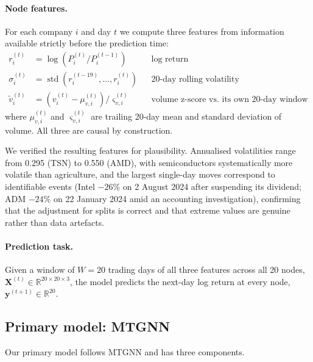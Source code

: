 \paragraph{Node features.} For each company $i$ and day $t$ we compute three features from information available strictly before the prediction time:
\begin{align}
r_i^{(t)} &= \log\!\left(P_i^{(t)} / P_i^{(t-1)}\right) && \text{log return}\\
\sigma_i^{(t)} &= \operatorname{std}\!\left(r_i^{(t-19)}, \ldots, r_i^{(t)}\right) && \text{20-day rolling volatility}\\
\tilde{v}_i^{(t)} &= \left(v_i^{(t)} - \mu_{v,i}^{(t)}\right) / \varsigma_{v,i}^{(t)} && \text{volume z-score vs.\ its own 20-day window}
\end{align}
where $\mu_{v,i}^{(t)}$ and $\varsigma_{v,i}^{(t)}$ are trailing 20-day mean and standard deviation of volume. All three are causal by construction.

We verified the resulting features for plausibility. Annualised volatilities range from 0.295 (TSN) to 0.550 (AMD), with semiconductors systematically more volatile than agriculture, and the largest single-day moves correspond to identifiable events (Intel $-26\%$ on 2 August 2024 after suspending its dividend; ADM $-24\%$ on 22 January 2024 amid an accounting investigation), confirming that the adjustment for splits is correct and that extreme values are genuine rather than data artefacts.

\paragraph{Prediction task.} Given a window of $W = 20$ trading days of all three features across all 20 nodes, $\mathbf{X}^{(t)} \in \mathbb{R}^{20 \times 20 \times 3}$, the model predicts the next-day log return at every node, $\mathbf{y}^{(t+1)} \in \mathbb{R}^{20}$.

\subsection{Primary model: MTGNN}

Our primary model follows MTGNN \parencite{wu2020mtgnn} and has three components.


